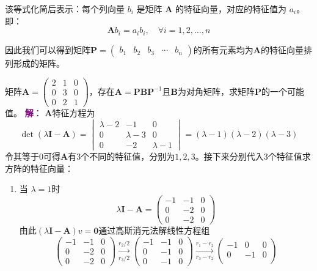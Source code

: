 该等式化简后表示：每个列向量 $b_i$ 是矩阵 $\mathbf{A}$ 的特征向量，对应的特征值为 $a_i$。即：
$$
\mathbf{A} b_i = a_i b_i, \quad \forall i = 1, 2, \ldots, n
$$

因此我们可以得到矩阵$\mathbf{P}=\begin{pmatrix}
	b_1 & b_2 & b_3 & \cdots & b_n
\end{pmatrix}$的所有元素均为$\mathbf{A}$的特征向量排列形成的矩阵。

\begin{example}
	矩阵$\mathbf{A}=\begin{pmatrix}
			2 & 1 & 0\\
			0 & 3 & 0\\
			0 & 2 & 1
		\end{pmatrix}$，存在$\mathbf{A}=\mathbf{P}\mathbf{B}	\mathbf{P}^{-1}$且$\mathbf{B}$为对角矩阵，求矩阵$\mathbf{P}$的一个可能值。
	   	\tcblower
		\textcolor{purple}{\textbf{解}}： $\mathbf{A}$特征方程为$$\det (\lambda \mathbf{I}-\mathbf{A})=\begin{vmatrix}
			\lambda-2 & -1 & 0\\
			0 & \lambda-3 & 0\\
			0 & -2 & \lambda -1
		\end{vmatrix}=(\lambda -1)(\lambda -2)(\lambda -3)$$令其等于0可得$\mathbf{A}$有3个不同的特征值，分别为$1,2,3$。接下来分别代入3个特征值求方阵的特征向量：
		   	\begin{enumerate}
			\item 当 $\lambda=1$时$$\lambda \mathbf{I}-\mathbf{A}=\begin{pmatrix}
				-1 & -1 & 0\\
				0 & -2 & 0\\
				0 & -2 & 0
			\end{pmatrix}$$由此$(\lambda \mathbf{I}-\mathbf{A})v=\boldsymbol{0}$通过高斯消元法解线性方程组$$\begin{pmatrix}
				-1 & -1 & 0\\
				0 & -2 & 0\\
				0 & -2 & 0
			\end{pmatrix}\xrightarrow[r_3/2]{r_2/2} \begin{pmatrix}
				-1 & -1 & 0\\
				0 & -1 & 0\\
				0 & -1 & 0
			\end{pmatrix}\xrightarrow[r_3-r_2]{r_1-r_2}\begin{pmatrix}
				-1 & 0 & 0\\
				0 & -1 & 0\\

\end{pmatrix}$$
\end{enumerate}
\end{example}
